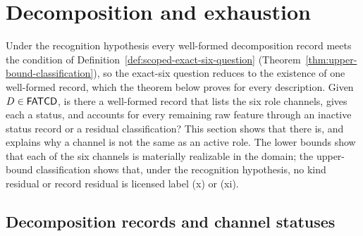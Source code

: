 \section{Decomposition and exhaustion}\label{sec:decomposition-exhaustion}



Under the recognition hypothesis every well-formed decomposition record meets
the condition of Definition~\ref{def:scoped-exact-six-question}
(Theorem~\ref{thm:upper-bound-classification}), so the exact-six question
reduces to the existence of one well-formed record, which the theorem below
proves for every description. Given \(D \in \mathsf{FATCD}{}\), is there a
well-formed record that lists the six role channels, gives each a
status, and accounts for every remaining raw feature through an
inactive status record or a residual classification? This section shows that there is, and explains why a
channel is not the same as an active role. The lower bounds show that each
of the six channels is materially realizable in the domain; the
upper-bound classification shows that, under the recognition hypothesis, no
kind residual or record residual is licensed label (x) or (xi).

\subsection{Decomposition records and channel statuses}\label{subsec:dec-records}

